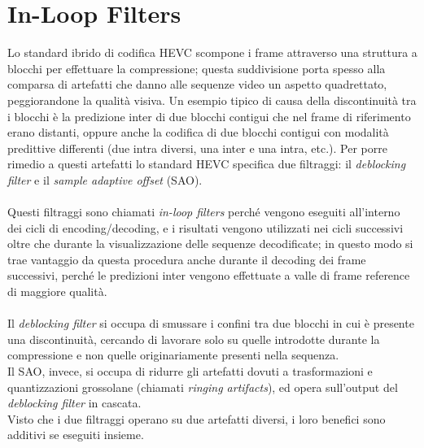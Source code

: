 \section{In-Loop Filters}
Lo standard ibrido di codifica HEVC scompone i frame attraverso una struttura a 
blocchi per effettuare la compressione; questa suddivisione porta spesso alla 
comparsa di artefatti che danno alle sequenze video un aspetto quadrettato, 
peggiorandone la qualità visiva. Un esempio tipico di causa della discontinuità 
tra i blocchi è la predizione inter di due blocchi contigui che nel frame
 di riferimento erano distanti, oppure anche la codifica di due blocchi contigui
 con modalità predittive differenti (due intra diversi, una inter e una intra, 
etc.). Per porre rimedio a questi artefatti lo standard HEVC specifica due 
filtraggi: il \emph{deblocking filter} e il \emph{sample adaptive offset} (SAO).
\\ \\
Questi filtraggi sono chiamati \emph{in-loop filters} perché vengono eseguiti 
all'interno dei cicli di encoding/decoding, e i risultati vengono utilizzati 
nei cicli successivi oltre che durante la visualizzazione delle sequenze 
decodificate; in questo modo si trae vantaggio da questa procedura anche durante
 il decoding dei frame successivi, perché le predizioni inter vengono effettuate
 a valle di frame reference di maggiore qualità.
\\ \\
Il \emph{deblocking filter} si occupa di smussare i confini tra due blocchi in 
cui è presente una discontinuità, cercando di lavorare solo su quelle 
introdotte durante la compressione e non quelle originariamente presenti nella 
sequenza. \\
Il SAO, invece, si occupa di ridurre gli artefatti dovuti a trasformazioni e 
quantizzazioni grossolane (chiamati \emph{ringing artifacts}), ed opera 
sull'output del \emph{deblocking filter} in cascata. \\
Visto che i due filtraggi operano su due artefatti diversi, i loro benefici 
sono additivi se eseguiti insieme.


